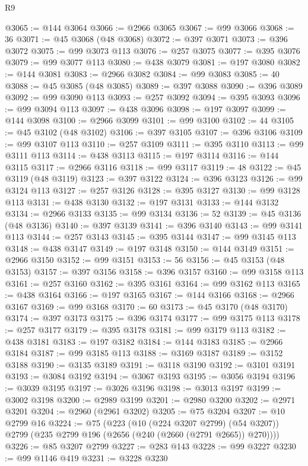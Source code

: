 \begin{lexlean}{R9}
\begin{coremodule}
@3065 := @144 @3064
@3066 := @2966 @3065
@3067 := @99 @3066
@3068 := 36
@3071 := @45 @3068 (@48 @3068)
@3072 := @397 @3071
@3073 := @396 @3072
@3075 := @99 @3073 @113
@3076 := @257 @3075
@3077 := @395 @3076
@3079 := @99 @3077 @113
@3080 := @438 @3079
@3081 := @197 @3080
@3082 := @144 @3081
@3083 := @2966 @3082
@3084 := @99 @3083
@3085 := 40
@3088 := @45 @3085 (@48 @3085)
@3089 := @397 @3088
@3090 := @396 @3089
@3092 := @99 @3090 @113
@3093 := @257 @3092
@3094 := @395 @3093
@3096 := @99 @3094 @113
@3097 := @438 @3096
@3098 := @197 @3097
@3099 := @144 @3098
@3100 := @2966 @3099
@3101 := @99 @3100
@3102 := 44
@3105 := @45 @3102 (@48 @3102)
@3106 := @397 @3105
@3107 := @396 @3106
@3109 := @99 @3107 @113
@3110 := @257 @3109
@3111 := @395 @3110
@3113 := @99 @3111 @113
@3114 := @438 @3113
@3115 := @197 @3114
@3116 := @144 @3115
@3117 := @2966 @3116
@3118 := @99 @3117
@3119 := 48
@3122 := @45 @3119 (@48 @3119)
@3123 := @397 @3122
@3124 := @396 @3123
@3126 := @99 @3124 @113
@3127 := @257 @3126
@3128 := @395 @3127
@3130 := @99 @3128 @113
@3131 := @438 @3130
@3132 := @197 @3131
@3133 := @144 @3132
@3134 := @2966 @3133
@3135 := @99 @3134
@3136 := 52
@3139 := @45 @3136 (@48 @3136)
@3140 := @397 @3139
@3141 := @396 @3140
@3143 := @99 @3141 @113
@3144 := @257 @3143
@3145 := @395 @3144
@3147 := @99 @3145 @113
@3148 := @438 @3147
@3149 := @197 @3148
@3150 := @144 @3149
@3151 := @2966 @3150
@3152 := @99 @3151
@3153 := 56
@3156 := @45 @3153 (@48 @3153)
@3157 := @397 @3156
@3158 := @396 @3157
@3160 := @99 @3158 @113
@3161 := @257 @3160
@3162 := @395 @3161
@3164 := @99 @3162 @113
@3165 := @438 @3164
@3166 := @197 @3165
@3167 := @144 @3166
@3168 := @2966 @3167
@3169 := @99 @3168
@3170 := 60
@3173 := @45 @3170 (@48 @3170)
@3174 := @397 @3173
@3175 := @396 @3174
@3177 := @99 @3175 @113
@3178 := @257 @3177
@3179 := @395 @3178
@3181 := @99 @3179 @113
@3182 := @438 @3181
@3183 := @197 @3182
@3184 := @144 @3183
@3185 := @2966 @3184
@3187 := @99 @3185 @113
@3188 := @3169 @3187
@3189 := @3152 @3188
@3190 := @3135 @3189
@3191 := @3118 @3190
@3192 := @3101 @3191
@3193 := @3084 @3192
@3194 := @3067 @3193
@3195 := @3056 @3194
@3196 := @3039 @3195
@3197 := @3026 @3196
@3198 := @3013 @3197
@3199 := @3002 @3198
@3200 := @2989 @3199
@3201 := @2980 @3200
@3202 := @2971 @3201
@3204 := @2960 (@2961 @3202)
@3205 := @75 @3204
@3207 := @10 @2799 @16
@3224 := @75
    (@223
      (@10 (@224 @3207 @2799) (@54 @3207))
      @2799
      (@235 @2799 @196 (@2656 (@240 (@2660 (@2791 @2665)) @270))))
@3226 := @85 @3207 @2799
@3227 := @283 @143
@3228 := @99 @3227
@3230 := @99 @1146 @419
@3231 := @3228 @3230

\end{coremodule}
\end{lexlean}
